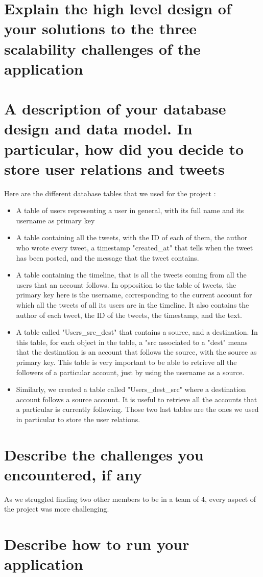 \documentclass[11pt,a4paper]{article}
\begin{document}
\section{Explain the high level design of your solutions to the three scalability challenges of the application}

\section{A description of your database design and data model. In particular, how did you decide to store user relations and tweets}
Here are the different database tables that we used for the project : 
\begin{itemize}
\item A table of users representing a user in general, with its full name and its username as primary key
\item A table containing all the tweets, with the ID of each of them, the author who wrote every tweet, a timestamp "created\_at" that tells when the tweet has been posted, and the message that the tweet contains. 
\item A table containing the timeline, that is all the tweets coming from all the users that an account follows. In opposition to the table of tweets, the primary key here is the username, corresponding to the current account for which all the tweets of all its users are in the timeline. It also contains the author of each tweet, the ID of the tweets, the timestamp, and the text.
\item A table called "Users\_src\_dest" that contains a source, and a destination. In this table, for each object in the table, a "src associated to a "dest" means that the destination is an account that follows the source, with the source as primary key. This table is very important to be able to retrieve all the followers of a particular account, just by using the username as a source.
\item Similarly, we created a table called "Users\_dest\_src" where a destination account follows a source account. It is useful to retrieve all the accounts that a particular is currently following. Those two last tables are the ones we used in particular to store the user relations.
\end{itemize}

\section{Describe the challenges you encountered, if any}
As we struggled finding two other members to be in a team of 4, every aspect of the project was more challenging.
\section{Describe how to run your application}
\end{document}
